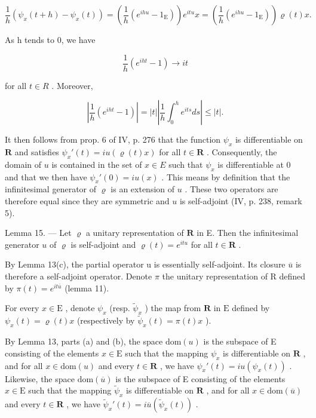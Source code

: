 \[
\frac {1}{h} \left(\psi_ {x} (t + h) - \psi_ {x} (t)\right) = \left(\frac {1}{h} \left(e ^ {i h u} - 1 _ {\mathrm{E}}\right)\right) e ^ {i t u} x = \left(\frac {1}{h} \left(e ^ {i h u} - 1 _ {\mathrm{E}}\right)\right) \varrho (t) x.
\]

As h tends to 0, we have

\[
\frac {1}{h} (e ^ {i h t} - 1) \rightarrow i t
\]

for all \(t \in R\) . Moreover,

\[
\left| \frac {1}{h} (e ^ {i h t} - 1) \right| = | t | \left| \frac {1}{h} \int_ {0} ^ {h} e ^ {i t s} d s \right| \leqslant | t |.
\]

It then follows from prop. 6 of IV, p. 276 that the function \(\psi_x\) is differentiable on \(\mathbf{R}\) and satisfies \(\psi_x'(t) = i u(\varrho(t)x)\) for all \(t \in \mathbf{R}\) . Consequently, the domain of \(u\) is contained in the set of \(x \in E\) such that \(\psi_x\) is differentiable at 0 and that we then have \(\psi_x'(0) = i u(x)\) . This means by definition that the infinitesimal generator of \(\varrho\) is an extension of \(u\) . These two operators are therefore equal since they are symmetric and \(u\) is self-adjoint (IV, p. 238, remark 5).

Lemma 15. --- Let \(\varrho\) a unitary representation of \(\mathbf{R}\) in E. Then the infinitesimal generator \(u\) of \(\varrho\) is self-adjoint and \(\varrho(t) = e^{itu}\) for all \(t \in \mathbf{R}\) .

By Lemma 13(c), the partial operator u is essentially self-adjoint. Its closure \(\overline{u}\) is therefore a self-adjoint operator. Denote \(\pi\) the unitary representation of R defined by \(\pi(t) = e^{it\overline{u}}\) (lemma 11).

For every \(x \in \mathrm{E}\) , denote \(\psi_x\) (resp. \(\widetilde{\psi}_x\) ) the map from \(\mathbf{R}\) in \(\mathrm{E}\) defined by \(\psi_x(t) = \varrho(t)x\) (respectively by \(\widetilde{\psi}_x(t) = \pi(t)x\) ).

By Lemma 13, parts (a) and (b), the space \(\mathrm{dom}(u)\) is the subspace of E consisting of the elements \(x \in \mathrm{E}\) such that the mapping \(\psi_x\) is differentiable on \(\mathbf{R}\) , and for all \(x \in \mathrm{dom}(u)\) and every \(t \in \mathbf{R}\) , we have \(\psi_x'(t) = i u (\psi_x(t))\) . Likewise, the space \(\mathrm{dom}(\overline{u})\) is the subspace of E consisting of the elements \(x \in \mathrm{E}\) such that the mapping \(\widetilde{\psi}_x\) is differentiable on \(\mathbf{R}\) , and for all \(x \in \mathrm{dom}(\overline{u})\) and every \(t \in \mathbf{R}\) , we have \(\widetilde{\psi}_x'(t) = i \overline{u} (\widetilde{\psi}_x(t))\) .


